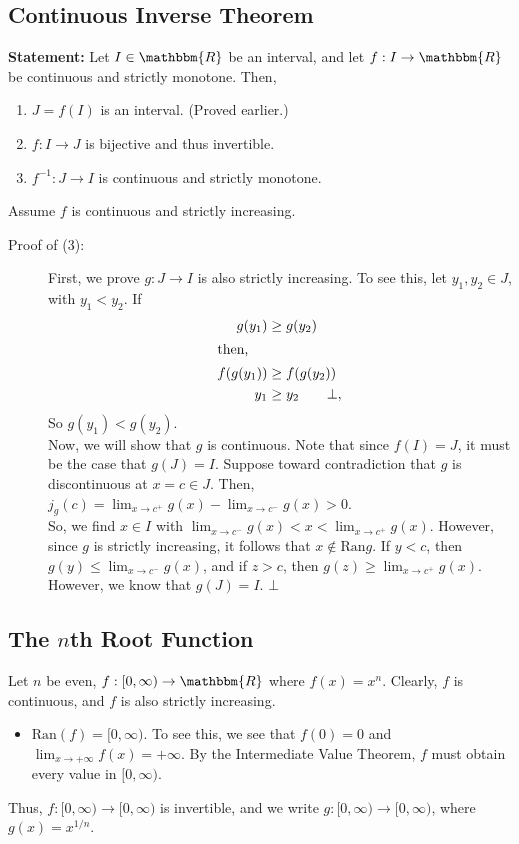 \documentclass[10pt]{extarticle}
\newcommand{\ran}{\text{Ran}}
\newcommand{\R}{\mathbbm{R}}
\begin{document}
  \subsection{Continuous Inverse Theorem}%
    \textbf{Statement:} Let $I\in\R$ be an interval, and let $f: I\rightarrow \R$ be continuous and strictly monotone. Then,
    \begin{enumerate}[(1)]
      \item $J = f(I)$ is an interval. (Proved earlier.)
      \item $f: I\rightarrow J$ is bijective and thus invertible.
      \item $f^{-1}: J\rightarrow I$ is continuous and strictly monotone.
    \end{enumerate}

    Assume $f$ is continuous and strictly increasing.
    \begin{description}
      \item[Proof of (3):] First, we prove $g: J\rightarrow I$ is also strictly increasing. To see this, let $y_1,y_2\in J$, with $y_1 < y_2$. If
        \begin{align*}
          g(y_1) &\geq g(y_2)\\
          \shortintertext{then,}
          f(g(y_1)) &\geq f(g(y_2))\\
          y_1 &\geq y_2 \tag*{$\bot$},
        \end{align*}
        So $g(y_1) < g(y_2)$.\\

        Now, we will show that $g$ is continuous. Note that since $f(I) = J$, it must be the case that $g(J) = I$. Suppose toward contradiction that $g$ is discontinuous at $x=c\in J$. Then, $j_g(c) = \lim_{x\rightarrow c^{+}}g(x) - \lim_{x\rightarrow c^{-}}g(x)> 0$.\\

        So, we find $x\in I$ with $\lim_{x\rightarrow c^{-}}g(x)<x<\lim_{x\rightarrow c^{+}}g(x)$. However, since $g$ is strictly increasing, it follows that $x\notin \ran{g}$. If $y < c$, then $g(y) \leq \lim_{x\rightarrow c^{-}}g(x)$, and if $z > c$, then $g(z) \geq \lim_{x\rightarrow c^{+}}g(x)$. However, we know that $g(J) = I$. $\bot$
    \end{description}
  \subsection{The $n$th Root Function}%
    Let $n$ be even, $f:[0,\infty)\rightarrow \R$ where $f(x) = x^n$. Clearly, $f$ is continuous, and $f$ is also strictly increasing.
    \begin{itemize}
      \item $\ran(f) = [0,\infty)$. To see this, we see that $f(0) = 0$ and $\lim_{x\rightarrow +\infty}f(x) = +\infty$. By the Intermediate Value Theorem, $f$ must obtain every value in $[0,\infty)$.
    \end{itemize}
    Thus, $f:[0,\infty) \rightarrow [0,\infty)$ is invertible, and we write $g: [0,\infty) \rightarrow [0,\infty)$, where $g(x) = x^{1/n}$.\\
\end{document}
